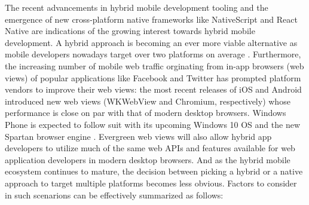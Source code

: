 \documentclass[thesis.tex]{subfiles}
\begin{document}
The recent advancements in hybrid mobile development tooling and the emergence of new cross-platform native frameworks like NativeScript and React Native are indications of the growing interest towards hybrid mobile development. A hybrid approach is becoming an ever more viable alternative as mobile developers nowadays target over two platforms on average \cite{two_platforms}. Furthermore, the increasing number of mobile web traffic orginating from in-app browsers (web views) of popular applications like Facebook and Twitter has prompted platform vendors to improve their web views: the most recent releases of iOS and Android introduced new web views (WKWebView and Chromium, respectively) whose performance is close on par with that of modern desktop browsers. \cite{souders_webview} Windows Phone is expected to follow suit with its upcoming Windows 10 OS and the new Spartan browser engine \cite{spartan}. Evergreen web views will also allow hybrid app developers to utilize much of the same web APIs and features available for web application developers in modern desktop browsers. And as the hybrid mobile ecosystem continues to mature, the decision between picking a hybrid or a native approach to target multiple platforms becomes less obvious. Factors to consider in such scenarions can be effectively summarized as follows:
\end{document}

